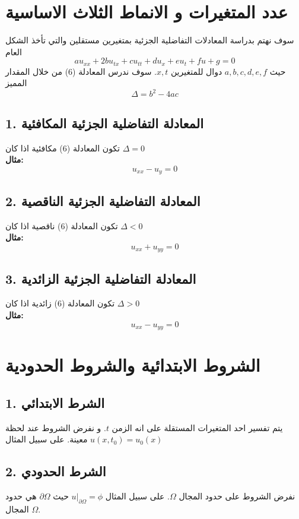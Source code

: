 \section[عدد المتغيرات و الانماط الثلاث الاساسية]{عدد المتغيرات و الانماط الثلاث الاساسية \cite{pde3}}
سوف نهتم بدراسة المعادلات التفاضلية الجزئية بمتغيرين مستقلين والتي تأخذ الشكل العام
\begin{equation}
	a u_{xx} + 2bu_{tx} + cu_{tt} + du_x + eu_t + fu + g = 0
\end{equation}
حيث $a,b,c,d,e,f$ دوال للمتغيرين $x,t$. سوف ندرس المعادلة (6) من خلال المقدار المميز
\begin{equation}
	\Delta = b^2 - 4ac
\end{equation}

\subsection*{1. المعادلة التفاضلية الجزئية المكافئية}
تكون المعادلة (6) مكافئية اذا كان $\Delta =0 $ \\
\textbf{مثال:}
 \begin{equation*}
 	u_{xx} - u_y = 0
 \end{equation*}
 
 \subsection*{2. المعادلة التفاضلية الجزئية الناقصية}
 تكون المعادلة (6) ناقصية اذا كان $\Delta < 0 $ \\
 \textbf{مثال:}
 \begin{equation*}
 	u_{xx} + u_{yy} = 0
 \end{equation*}
 
 \subsection*{3. المعادلة التفاضلية الجزئية الزائدية}
 تكون المعادلة (6) زائدية اذا كان $\Delta > 0$ \\
 \textbf{مثال:}
 \begin{equation*}
 	u_{xx} - u_{yy} = 0
 \end{equation*}
 
 \section[الشروط الابتدائية و الشروط الحدودية]{الشروط الابتدائية والشروط الحدودية \cite{pde2}}
 
 \subsection*{1. الشرط الابتدائي}
 يتم تفسير احد المتغيرات المستقلة على انه الزمن $t$. و نفرض الشروط عند لحظة معينة. على سبيل المثال
 $u(x, t_0) = u_0(x)$
 
 \subsection*{2. الشرط الحدودي}
 نفرض الشروط على حدود المجال $\Omega$. على سبيل المثال
 $u|_{\partial \Omega} = \phi$
 حيث $\partial\Omega$ هي حدود المجال $\Omega$.
 
 